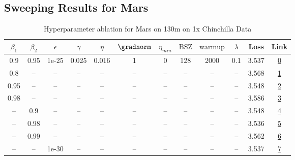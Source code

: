 \subsection{Sweeping Results for Mars}%
\begin{table}[H]
\centering
\caption{Hyperparameter ablation for Mars on 130m on 1x Chinchilla Data}
\label{tab:ablation_mars_130m_on_1x_chinchilla_data}
\begin{tabular}{cccccccccccc}
\toprule
$\beta_1$ & $\beta_2$ & $\epsilon$ & $\gamma$ & $\eta$ & $\gradnorm$ & $\eta_{min}$ & $\mathrm{BSZ}$ & $\mathrm{warmup}$ & $\lambda$ & Loss & Link \\
\midrule
0.9 & 0.95 & 1e-25 & 0.025 & 0.016 & 1 & 0 & 128 & 2000 & 0.1 & 3.537 & \href{https://wandb.ai/stanford-mercury/optimizer-scaling/runs/sweep-130m-2B-mars692316lr0.016-wd0.1-minlr0-warmup2000-b10.9-b2-93e276}{0} \\
\midrule
0.8 & -- & -- & -- & -- & -- & -- & -- & -- & -- & 3.568 & \href{https://wandb.ai/stanford-mercury/optimizer-scaling/runs/sweep-130m-2B-mars429f19lr0.016-wd0.1-minlr0-warmup2000-b10.8-b2-8e6b1f}{1} \\
0.95 & -- & -- & -- & -- & -- & -- & -- & -- & -- & 3.548 & \href{https://wandb.ai/stanford-mercury/optimizer-scaling/runs/sweep-130m-2B-mars07f867lr0.016-wd0.1-minlr0-warmup2000-b10.95-b-1c9da8}{2} \\
0.98 & -- & -- & -- & -- & -- & -- & -- & -- & -- & 3.586 & \href{https://wandb.ai/stanford-mercury/optimizer-scaling/runs/sweep-130m-2B-mars32fa0blr0.016-wd0.1-minlr0-warmup2000-b10.98-b-f2c1f5}{3} \\
-- & 0.9 & -- & -- & -- & -- & -- & -- & -- & -- & 3.548 & \href{https://wandb.ai/stanford-mercury/optimizer-scaling/runs/sweep-130m-2B-mars2816c1lr0.016-wd0.1-minlr0-warmup2000-b10.9-b2-ea14d0}{4} \\
-- & 0.98 & -- & -- & -- & -- & -- & -- & -- & -- & 3.536 & \href{https://wandb.ai/stanford-mercury/optimizer-scaling/runs/sweep-130m-2B-marse45e36lr0.016-wd0.1-minlr0-warmup2000-b10.9-b2-2de81b}{5} \\
-- & 0.99 & -- & -- & -- & -- & -- & -- & -- & -- & 3.562 & \href{https://wandb.ai/stanford-mercury/optimizer-scaling/runs/sweep-130m-2B-mars2f8911lr0.016-wd0.1-minlr0-warmup2000-b10.9-b2-172044}{6} \\
-- & -- & 1e-30 & -- & -- & -- & -- & -- & -- & -- & 3.537 & \href{https://wandb.ai/stanford-mercury/optimizer-scaling/runs/sweep-130m-2B-mars692316lr0.016-wd0.1-minlr0-warmup2000-b10.9-b2-93e276}{7} \\

\end{tabular}
\end{table}
